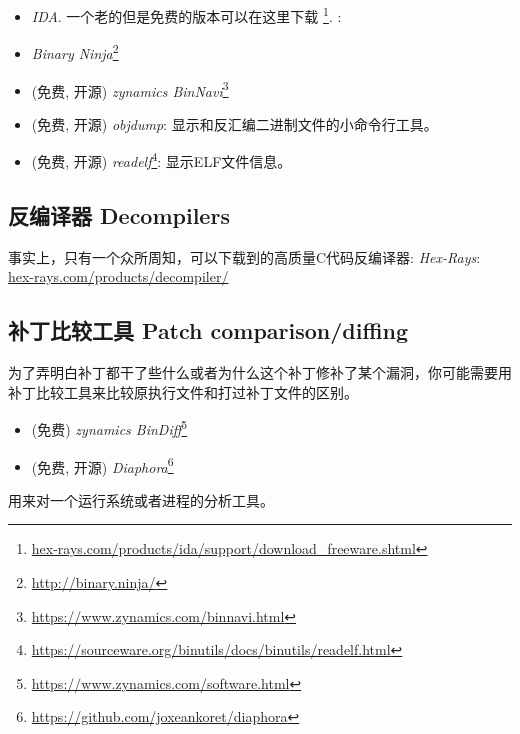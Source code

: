 \documentclass[UTF8,nofonts]{ctexart}
\begin{document}
\begin{itemize}
\item \emph{IDA}. 一个老的但是免费的版本可以在这里下载
\footnote{\href{http://go.yurichev.com/17031}{hex-rays.com/products/ida/support/download\_freeware.shtml}}.
\ShortHotKeyCheatsheet: 

\item \emph{Binary Ninja}\footnote{\url{http://binary.ninja/}}

\item (免费, 开源) \emph{zynamics BinNavi}\footnote{\url{https://www.zynamics.com/binnavi.html}}

\item (免费, 开源) \emph{objdump}: 显示和反汇编二进制文件的小命令行工具。

\item (免费, 开源) \emph{readelf}\footnote{\url{https://sourceware.org/binutils/docs/binutils/readelf.html}}:
显示ELF文件信息。
\end{itemize}

\subsection{反编译器 Decompilers}

事实上，只有一个众所周知，可以下载到的高质量C代码反编译器: \emph{Hex-Rays}:\\
\href{http://go.yurichev.com/17033}{hex-rays.com/products/decompiler/}


\subsection{补丁比较工具 Patch comparison/diffing}

为了弄明白补丁都干了些什么或者为什么这个补丁修补了某个漏洞，你可能需要用补丁比较工具来比较原执行文件和打过补丁文件的区别。

\begin{itemize}
\item (免费) \emph{zynamics BinDiff}\footnote{\url{https://www.zynamics.com/software.html}}

\item (免费, 开源) \emph{Diaphora}\footnote{\url{https://github.com/joxeankoret/diaphora}}
\end{itemize}


用来对一个运行系统或者进程的分析工具。
\end{document}
